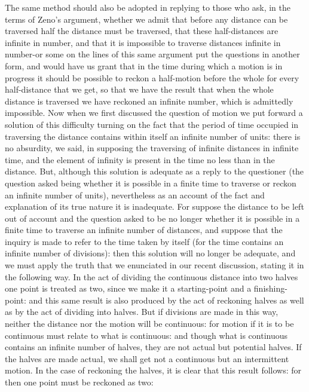The same method should also be adopted in replying to those who ask,
in the terms of Zeno's argument, whether we admit that before any
distance can be traversed half the distance must be traversed, that
these half-distances are infinite in number, and that it is impossible
to traverse distances infinite in number-or some on the lines of this
same argument put the questions in another form, and would have us
grant that in the time during which a motion is in progress it should
be possible to reckon a half-motion before the whole for every half-distance
that we get, so that we have the result that when the whole distance
is traversed we have reckoned an infinite number, which is admittedly
impossible. Now when we first discussed the question of motion we
put forward a solution of this difficulty turning on the fact that
the period of time occupied in traversing the distance contains within
itself an infinite number of units: there is no absurdity, we said,
in supposing the traversing of infinite distances in infinite time,
and the element of infinity is present in the time no less than in
the distance. But, although this solution is adequate as a reply to
the questioner (the question asked being whether it is possible in
a finite time to traverse or reckon an infinite number of units),
nevertheless as an account of the fact and explanation of its true
nature it is inadequate. For suppose the distance to be left out of
account and the question asked to be no longer whether it is possible
in a finite time to traverse an infinite number of distances, and
suppose that the inquiry is made to refer to the time taken by itself
(for the time contains an infinite number of divisions): then this
solution will no longer be adequate, and we must apply the truth that
we enunciated in our recent discussion, stating it in the following
way. In the act of dividing the continuous distance into two halves
one point is treated as two, since we make it a starting-point and
a finishing-point: and this same result is also produced by the act
of reckoning halves as well as by the act of dividing into halves.
But if divisions are made in this way, neither the distance nor the
motion will be continuous: for motion if it is to be continuous must
relate to what is continuous: and though what is continuous contains
an infinite number of halves, they are not actual but potential halves.
If the halves are made actual, we shall get not a continuous but an
intermittent motion. In the case of reckoning the halves, it is clear
that this result follows: for then one point must be reckoned as two:
